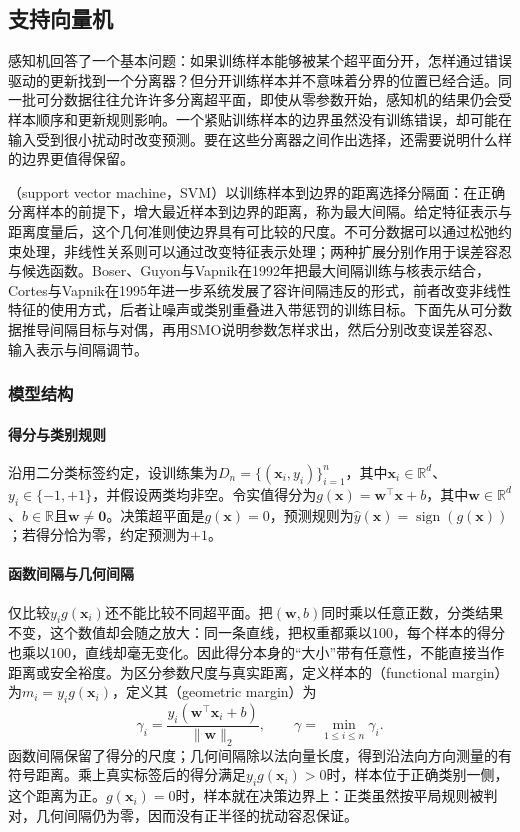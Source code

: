 \subsection{支持向量机}
\label{sec:classification-svm}

感知机回答了一个基本问题：如果训练样本能够被某个超平面分开，怎样通过错误驱动的更新找到一个分离器？但分开训练样本并不意味着分界的位置已经合适。同一批可分数据往往允许许多分离超平面，即使从零参数开始，感知机的结果仍会受样本顺序和更新规则影响。一个紧贴训练样本的边界虽然没有训练错误，却可能在输入受到很小扰动时改变预测。要在这些分离器之间作出选择，还需要说明什么样的边界更值得保留。

（support vector machine，SVM）以训练样本到边界的距离选择分隔面：在正确分离样本的前提下，增大最近样本到边界的距离，称为最大间隔。给定特征表示与距离度量后，这个几何准则使边界具有可比较的尺度。不可分数据可以通过松弛约束处理，非线性关系则可以通过改变特征表示处理；两种扩展分别作用于误差容忍与候选函数。Boser、Guyon与Vapnik在1992年把最大间隔训练与核表示结合，Cortes与Vapnik在1995年进一步系统发展了容许间隔违反的形式，前者改变非线性特征的使用方式，后者让噪声或类别重叠进入带惩罚的训练目标。下面先从可分数据推导间隔目标与对偶，再用SMO说明参数怎样求出，然后分别改变误差容忍、输入表示与间隔调节。

\subsubsection{模型结构}
\label{sec:classification-svm-model}

\paragraph{得分与类别规则}
沿用二分类标签约定，设训练集为$D_n=\{(\bm{x}_i,y_i)\}_{i=1}^n$，其中$\bm{x}_i\in\mathbb{R}^d$、$y_i\in\{-1,+1\}$，并假设两类均非空。令实值得分为$g(\bm{x})=\bm{w}^{\top}\bm{x}+b$，其中$\bm{w}\in\mathbb{R}^d$、$b\in\mathbb{R}$且$\bm{w}\ne\bm{0}$。决策超平面是$g(\bm{x})=0$，预测规则为$\hat y(\bm{x})=\operatorname{sign}(g(\bm{x}))$；若得分恰为零，约定预测为$+1$。

\paragraph{函数间隔与几何间隔}
仅比较$y_i g(\bm{x}_i)$还不能比较不同超平面。把$(\bm{w},b)$同时乘以任意正数，分类结果不变，这个数值却会随之放大：同一条直线，把权重都乘以$100$，每个样本的得分也乘以$100$，直线却毫无变化。因此得分本身的“大小”带有任意性，不能直接当作距离或安全裕度。为区分参数尺度与真实距离，定义样本的（functional margin）为$m_i=y_i g(\bm{x}_i)$，定义其（geometric margin）为
\begin{equation}
  \gamma_i
  =\frac{y_i(\bm{w}^{\top}\bm{x}_i+b)}
         {\lVert\bm{w}\rVert_2},
  \qquad
  \gamma=\min_{1\le i\le n}\gamma_i.
  \label{eq:classification-svm-margin}
\end{equation}
函数间隔保留了得分的尺度；几何间隔除以法向量长度，得到沿法向方向测量的有符号距离。乘上真实标签后的得分满足$y_i g(\bm x_i)>0$时，样本位于正确类别一侧，这个距离为正。$g(\bm x_i)=0$时，样本就在决策边界上：正类虽然按平局规则被判对，几何间隔仍为零，因而没有正半径的扰动容忍保证。

